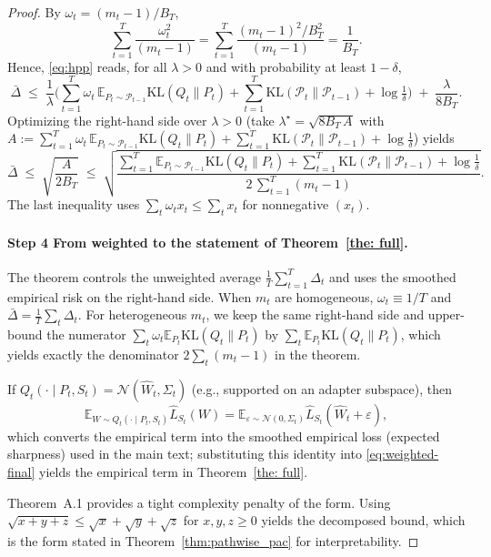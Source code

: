 \documentclass{article}
\theoremstyle{plain}
\theoremstyle{definition}
\theoremstyle{remark}
\begin{document}
\begin{proof}
By $\omega_t=(m_t-1)/B_T$,
\[
\sum_{t=1}^T \frac{\omega_t^2}{(m_t-1)}
=\sum_{t=1}^T \frac{(m_t-1)^2/B_T^2}{(m_t-1)}
=\frac{1}{B_T}.
\]
Hence, \eqref{eq:hpp} reads, for all $\lambda>0$ and with probability at least $1-\delta$,
\begin{equation}
\label{eq:gap-preopt}
\bar\Delta
\;\le\;
\frac{1}{\lambda}\Big(
\sum_{t=1}^T \omega_t\,\mathbb E_{P_t\sim\mathcal P_{t-1}}\mathrm{KL}(Q_t\|P_t)
+ \sum_{t=1}^T \mathrm{KL}(\mathcal P_t\|\mathcal P_{t-1})
+ \log\tfrac1\delta\Big)
\;+\;
\frac{\lambda}{8B_T}.
\end{equation}
Optimizing the right-hand side over $\lambda>0$ (take $\lambda^\star=\sqrt{8B_T\,A}$ with
$A:=\sum_{t=1}^T \omega_t\,\mathbb E_{P_t\sim\mathcal P_{t-1}}\mathrm{KL}(Q_t\|P_t)
+ \sum_{t=1}^T \mathrm{KL}(\mathcal P_t\|\mathcal P_{t-1}) + \log\tfrac1\delta$) yields
\begin{equation}
\label{eq:weighted-final}
\bar\Delta
\;\le\;
\sqrt{\frac{A}{2B_T}}
\;\le\;
\sqrt{\frac{
\sum_{t=1}^T \mathbb E_{P_t\sim\mathcal P_{t-1}}\mathrm{KL}(Q_t\|P_t)
+ \sum_{t=1}^T \mathrm{KL}(\mathcal P_t\|\mathcal P_{t-1})
+ \log\tfrac1\delta}{2\,\sum_{t=1}^T (m_t-1)}}.
\end{equation}
The last inequality uses $\sum_t \omega_t x_t \le \sum_t x_t$ for nonnegative $(x_t)$.

\paragraph{Step 4 From weighted to the statement of Theorem~\ref{the: full}.}
The theorem controls the unweighted average $\frac1T\sum_{t=1}^T \Delta_t$ and uses the smoothed empirical risk on the right-hand side.
When $m_t$ are homogeneous, $\omega_t\equiv 1/T$ and $\bar\Delta=\frac1T\sum_t\Delta_t$.
For heterogeneous $m_t$, we keep the same right-hand side and upper-bound the numerator $\sum_t \omega_t \mathbb E_{P_t}\mathrm{KL}(Q_t\|P_t)$ by $\sum_t \mathbb E_{P_t}\mathrm{KL}(Q_t\|P_t)$, which yields exactly the denominator $2\sum_t(m_t-1)$ in the theorem.


If $Q_t(\cdot\mid P_t,S_t)=\mathcal N(\hat W_t,\Sigma_t)$ (e.g., supported on an adapter subspace), then
\[
\mathbb E_{W\sim Q_t(\cdot\mid P_t,S_t)}\hat L_{S_t}(W)
=\mathbb E_{\varepsilon\sim\mathcal N(0,\Sigma_t)}\hat L_{S_t}(\hat W_t+\varepsilon),
\]
which converts the empirical term into the smoothed empirical loss (expected sharpness) used in the main text; substituting this identity into \eqref{eq:weighted-final} yields the empirical term in Theorem~\ref{the: full}.

Theorem~A.1 provides a tight complexity penalty of the form.
Using $\sqrt{x+y+z}\le \sqrt{x}+\sqrt{y}+\sqrt{z}$ for $x,y,z\ge 0$ yields the decomposed bound, which is the form stated in Theorem~\ref{thm:pathwise_pac} for interpretability.

\end{proof}
\end{document}
